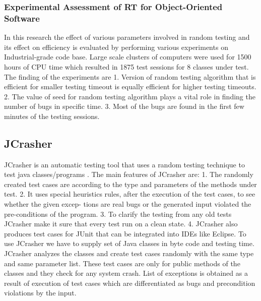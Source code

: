 \subsubsection{Experimental Assessment of RT for Object-Oriented Software}
In this research the effect of various parameters involved in random testing and its effect on efficiency is evaluated by performing various experiments on Industrial-grade code base.
Large scale clusters of computers were used for 1500 hours of CPU time which resulted in 1875 test sessions for 8 classes under test. \cite{Ciupa2007} The finding of the experiments are
1. Version of random testing algorithm that is efficient for smaller testing timeout is equally efficient for higher testing timeouts.
2. The value of seed for random testing algorithm plays a vital role in finding the number of bugs in specific time.
3. Most of the bugs are found in the first few minutes of the testing sessions.



\subsection{JCrasher}
JCrasher is an automatic testing tool that uses a random testing technique to test java classes/programs \cite{Pacheco2007b}. The main features of JCrasher are:
1. The randomly created test cases are according to the type and parameters of the methods under test.
2. It uses special heuristics rules, after the execution of the test cases, to see whether the given excep- tions are real bugs or the generated input violated the pre-conditions of the program.
3. To clarify the testing from any old tests JCrasher make it sure that every test run on a clean state.
4. JCrasher also produces test cases for JUnit that can be integrated into IDEs like Eclipse.
To use JCrasher we have to supply set of Java classes in byte code and testing time. JCrasher analyzes the classes and create test cases randomly with the same type and same parameter list. These test cases are only for public methods of the classes and they check for any system crash. List of exceptions is obtained as a result of execution of test cases which are differentiated as bugs and precondition violations by the input.

